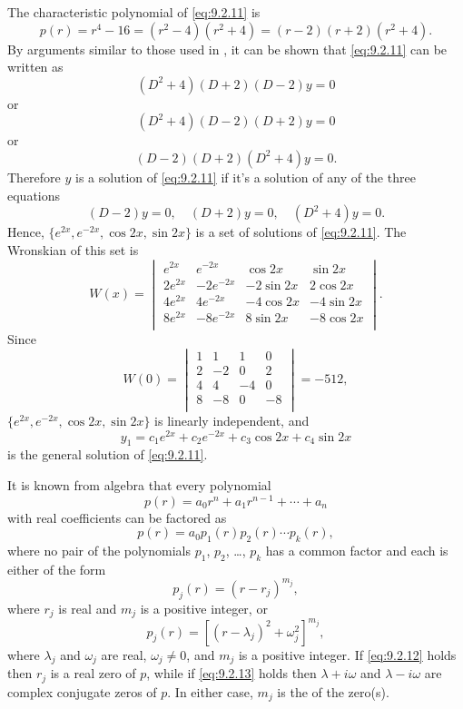 \begin{solution}
The characteristic polynomial of
\eqref{eq:9.2.11} is
\[
p(r)=r^4-16=(r^2-4)(r^2+4)=(r-2)(r+2)(r^2+4).
\]
By arguments similar to those used in , it can be shown that \eqref{eq:9.2.11} can be written
as
\[
(D^2+4)(D+2)(D-2)y=0
\]
or
\[
(D^2+4)(D-2)(D+2)y=0
\]
or
\[
(D-2)(D+2)(D^2+4)y=0.
\]
Therefore $y$  is a solution of \eqref{eq:9.2.11} if it's a solution
of any  of the three  equations
\[
 (D-2)y=0,\quad (D+2)y=0, \quad(D^2+4)y=0.
\]
Hence, $\{e^{2x},e^{-2x},\cos2x,\sin2x\}$ is a set of solutions of
\eqref{eq:9.2.11}. The Wronskian of this set is
\[
W(x)=\begin{vmatrix}
e^{2x}&e^{-2x}&\cos2x&\sin2x\\
2e^{2x}&-2e^{-2x}&-2\sin2x&2\cos2x\\
4e^{2x}&4e^{-2x}&-4\cos2x&-4\sin2x\\
8e^{2x}&-8e^{-2x}&8\sin2x&-8\cos2x\\
\end{vmatrix}.
\]
Since
\[
W(0)=\begin{vmatrix}
1&1&1&0\\
2&-2&0&2\\
4&4&-4&0\\
8&-8&0&-8\\
\end{vmatrix}=-512,
\]
 $\{e^{2x},e^{-2x},\cos2x,\sin2x\}$ is linearly independent,
and
\[
y_1=c_1e^{2x}+c_2e^{-2x}+c_3\cos2x+c_4\sin2x
\]
is   the general solution of \eqref{eq:9.2.11}.
\end{solution}

It is known from algebra that every polynomial
\[
p(r)=a_0r^n+a_1r^{n-1}+\cdots+a_n
\]
with real coefficients can be factored as
\[
p(r)=a_0p_1(r)p_2(r)\cdots p_k(r),
\]
where no pair of the polynomials $p_1$, $p_2$, \dots, $p_k$  has a common
factor and each  is either of the form
\begin{equation} \label{eq:9.2.12}
p_j(r)=(r-r_j)^{m_j},
\end{equation}
where $r_j$ is real and $m_j$ is a positive integer, or
\begin{equation} \label{eq:9.2.13}
p_j(r)=\left[(r-\lambda_j)^2+\omega_j^2\right]^{m_j},
\end{equation}
where $\lambda_j$ and $\omega_j$ are real, $\omega_j\ne0$, and $m_j$
is a positive integer. If \eqref{eq:9.2.12} holds then $r_j$ is a real
zero of $p$, while if \eqref{eq:9.2.13} holds then $\lambda+i\omega$
and $\lambda-i\omega$ are complex conjugate zeros of $p$. In either
case, $m_j$ is the  of the zero(s).


